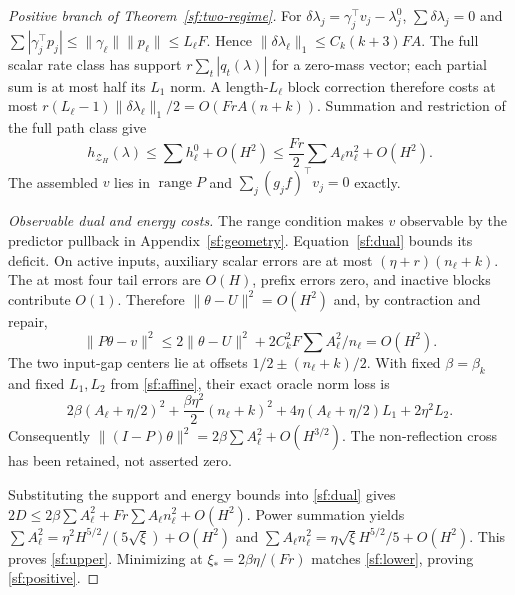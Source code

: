 \documentclass[journal]{IEEEtran}
\begin{document}
\begin{proof}[Positive branch of Theorem~\ref{sf:two-regime}]
For $\delta\lambda_j=\gamma_j^\top v_j-\lambda_j^0$,
$\sum\delta\lambda_j=0$ and
$\sum|\gamma_j^\top p_j|\le\|\gamma_\ell\|\|p_\ell\|\le L_\ell F$.
Hence $\|\delta\lambda_\ell\|_1\le C_k(k+3)FA$.
The full scalar rate class has support $r\sum_t|q_t(\lambda)|$ for a zero-mass vector;
each partial sum is at most half its $L_1$ norm.
A length-$L_\ell$ block correction therefore costs
at most $r(L_\ell-1)\|\delta\lambda_\ell\|_1/2=O(FrA(n+k))$.
Summation and restriction of the full path class give
\begin{equation}\label{sf:positive-support}
h_{\mathcal Z_H}(\lambda)\le\sum h_\ell^0+O(H^2)
\le\frac{Fr}{2}\sum A_\ell n_\ell^2+O(H^2).
\end{equation}
The assembled $v$ lies in $\operatorname{range}P$ and
$\sum_j(g_jf)^\top v_j=0$ exactly.

\par\smallskip\noindent\textit{Observable dual and energy costs.}\enspace 
The range condition makes $v$ observable by the predictor pullback in
Appendix~\ref{sf:geometry}. Equation~\eqref{sf:dual} bounds its deficit.
On active inputs, auxiliary scalar errors are at most $(\eta+r)(n_\ell+k)$.
The at most four tail errors are $O(H)$, prefix errors zero, and inactive
blocks contribute $O(1)$.
Therefore $\|\theta-U\|^2=O(H^2)$ and, by contraction and repair,
\[
\|P\theta-v\|^2\le2\|\theta-U\|^2+2C_k^2F\sum A_\ell^2/n_\ell=O(H^2).
\]
The two input-gap centers lie at offsets $1/2\pm(n_\ell+k)/2$.
With fixed $\beta=\beta_k$ and fixed $L_1,L_2$ from \eqref{sf:affine},
their exact oracle norm loss is
\[
2\beta(A_\ell+\eta/2)^2+\frac{\beta\eta^2}{2}(n_\ell+k)^2
+4\eta(A_\ell+\eta/2)L_1+2\eta^2L_2 .
\]
Consequently $\|(I-P)\theta\|^2=2\beta\sum A_\ell^2+O(H^{3/2})$.
The non-reflection cross has been retained, not asserted zero.

Substituting the support and energy bounds into \eqref{sf:dual} gives
$2D\le2\beta\sum A_\ell^2+Fr\sum A_\ell n_\ell^2+O(H^2)$.
Power summation yields
$\sum A_\ell^2=\eta^2H^{5/2}/(5\sqrt\xi)+O(H^2)$ and
$\sum A_\ell n_\ell^2=\eta\sqrt\xi H^{5/2}/5+O(H^2)$.
This proves \eqref{sf:upper}. Minimizing at
$\xi_*=2\beta\eta/(Fr)$ matches \eqref{sf:lower}, proving \eqref{sf:positive}.
\end{proof}
\end{document}

